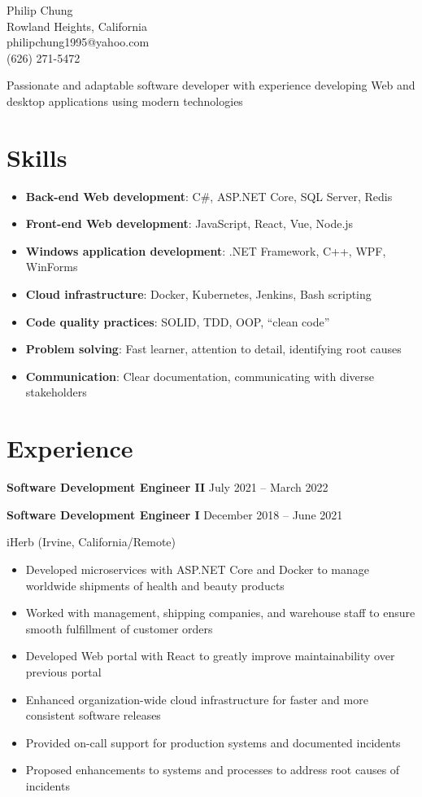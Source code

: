 \documentclass[10pt]{article}
\newcommand{\titleheader}[2]{\textbf{#1} \hfill #2}
\newcommand{\locheader}[2]{#1 (#2)}
\begin{document}
	\begin{center}
		{\LARGE Philip Chung} \\
		Rowland Heights, California \\
		philipchung1995@yahoo.com \\
		(626) 271-5472 \\
	\end{center}

	Passionate and adaptable software developer with experience developing Web and desktop applications using modern technologies

	\section*{Skills}

	\newcommand{\skillitem}[2]{\item \textbf{#1}: #2}

	\begin{itemize}
		\skillitem{Back-end Web development}{C\#, ASP.NET Core, SQL Server, Redis}
		\skillitem{Front-end Web development}{JavaScript, React, Vue, Node.js}
		\skillitem{Windows application development}{.NET Framework, C++, WPF, WinForms}
		\skillitem{Cloud infrastructure}{Docker, Kubernetes, Jenkins, Bash scripting}
		\skillitem{Code quality practices}{SOLID, TDD, OOP, ``clean code''}
		\skillitem{Problem solving}{Fast learner, attention to detail, identifying root causes}
		\skillitem{Communication}{Clear documentation, communicating with diverse stakeholders}
	\end{itemize}

	\section*{Experience}

	\titleheader{Software Development Engineer II}{July 2021 -- March 2022}

	\titleheader{Software Development Engineer I}{December 2018 -- June 2021}

	\locheader{iHerb}{Irvine, California/Remote}

	\begin{itemize}
		\item Developed microservices with ASP.NET Core and Docker to manage worldwide shipments of health and beauty products
		\item Worked with management, shipping companies, and warehouse staff to ensure smooth fulfillment of customer orders
		\item Developed Web portal with React to greatly improve maintainability over previous portal
		\item Enhanced organization-wide cloud infrastructure for faster and more consistent software releases
		\item Provided on-call support for production systems and documented incidents
		\item Proposed enhancements to systems and processes to address root causes of incidents
	\end{itemize}
\end{document}
